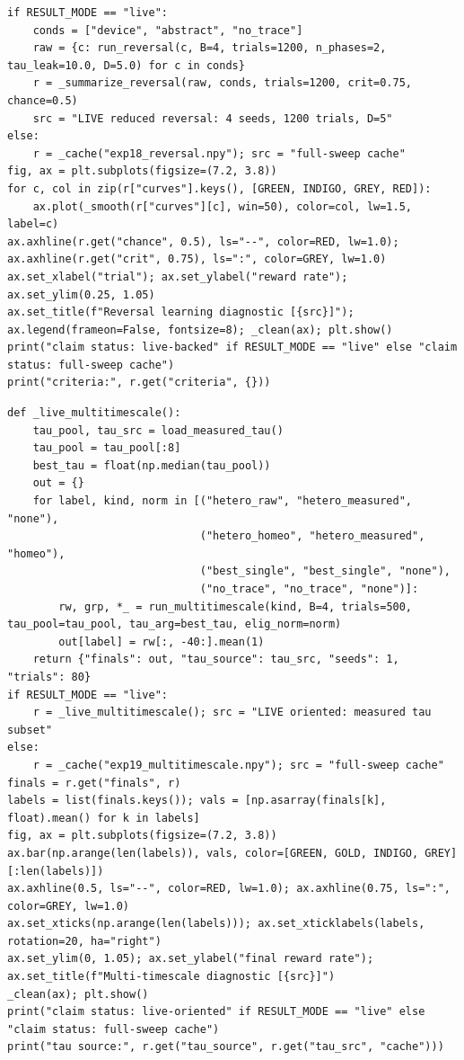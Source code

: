 \begin{lstlisting}[caption={06\_extensions.ipynb code cell 2},label={lst:mrl-nb-06-extensions-2}]
if RESULT_MODE == "live":
    conds = ["device", "abstract", "no_trace"]
    raw = {c: run_reversal(c, B=4, trials=1200, n_phases=2, tau_leak=10.0, D=5.0) for c in conds}
    r = _summarize_reversal(raw, conds, trials=1200, crit=0.75, chance=0.5)
    src = "LIVE reduced reversal: 4 seeds, 1200 trials, D=5"
else:
    r = _cache("exp18_reversal.npy"); src = "full-sweep cache"
fig, ax = plt.subplots(figsize=(7.2, 3.8))
for c, col in zip(r["curves"].keys(), [GREEN, INDIGO, GREY, RED]):
    ax.plot(_smooth(r["curves"][c], win=50), color=col, lw=1.5, label=c)
ax.axhline(r.get("chance", 0.5), ls="--", color=RED, lw=1.0); ax.axhline(r.get("crit", 0.75), ls=":", color=GREY, lw=1.0)
ax.set_xlabel("trial"); ax.set_ylabel("reward rate"); ax.set_ylim(0.25, 1.05)
ax.set_title(f"Reversal learning diagnostic [{src}]"); ax.legend(frameon=False, fontsize=8); _clean(ax); plt.show()
print("claim status: live-backed" if RESULT_MODE == "live" else "claim status: full-sweep cache")
print("criteria:", r.get("criteria", {}))
\end{lstlisting}

\begin{lstlisting}[caption={06\_extensions.ipynb code cell 3},label={lst:mrl-nb-06-extensions-3}]
def _live_multitimescale():
    tau_pool, tau_src = load_measured_tau()
    tau_pool = tau_pool[:8]
    best_tau = float(np.median(tau_pool))
    out = {}
    for label, kind, norm in [("hetero_raw", "hetero_measured", "none"),
                              ("hetero_homeo", "hetero_measured", "homeo"),
                              ("best_single", "best_single", "none"),
                              ("no_trace", "no_trace", "none")]:
        rw, grp, *_ = run_multitimescale(kind, B=4, trials=500, tau_pool=tau_pool, tau_arg=best_tau, elig_norm=norm)
        out[label] = rw[:, -40:].mean(1)
    return {"finals": out, "tau_source": tau_src, "seeds": 1, "trials": 80}
if RESULT_MODE == "live":
    r = _live_multitimescale(); src = "LIVE oriented: measured tau subset"
else:
    r = _cache("exp19_multitimescale.npy"); src = "full-sweep cache"
finals = r.get("finals", r)
labels = list(finals.keys()); vals = [np.asarray(finals[k], float).mean() for k in labels]
fig, ax = plt.subplots(figsize=(7.2, 3.8))
ax.bar(np.arange(len(labels)), vals, color=[GREEN, GOLD, INDIGO, GREY][:len(labels)])
ax.axhline(0.5, ls="--", color=RED, lw=1.0); ax.axhline(0.75, ls=":", color=GREY, lw=1.0)
ax.set_xticks(np.arange(len(labels))); ax.set_xticklabels(labels, rotation=20, ha="right")
ax.set_ylim(0, 1.05); ax.set_ylabel("final reward rate"); ax.set_title(f"Multi-timescale diagnostic [{src}]")
_clean(ax); plt.show()
print("claim status: live-oriented" if RESULT_MODE == "live" else "claim status: full-sweep cache")
print("tau source:", r.get("tau_source", r.get("tau_src", "cache")))
\end{lstlisting}

